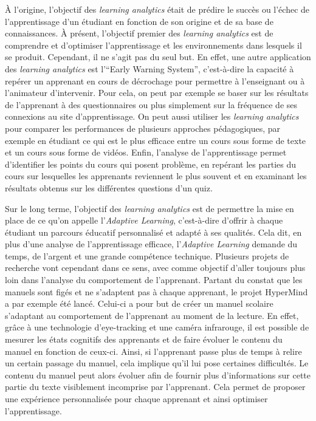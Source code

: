            À l’origine, l’objectif des \emph{learning analytics} était de prédire le succès ou l’échec de l’apprentissage d’un étudiant en fonction de son origine et de sa base de connaissances. À présent, l’objectif premier des \emph{learning analytics} est de comprendre et d’optimiser l’apprentissage et les environnements dans lesquels il se produit. Cependant, il ne s’agit pas du seul but. En effet, une autre application des \emph{learning analytics} est l’\enquote{Early Warning System}, c’est-à-dire la capacité à repérer un apprenant en cours de décrochage pour permettre à l’enseignant ou à l’animateur d’intervenir. Pour cela, on peut par exemple se baser sur les résultats de l’apprenant à des questionnaires ou plus simplement sur la fréquence de ses connexions au site d’apprentissage. On peut aussi utiliser les \emph{learning analytics} pour comparer les performances de plusieurs approches pédagogiques, par exemple en étudiant ce qui est le plus efficace entre un cours sous forme de texte et un cours sous forme de vidéos. Enfin, l’analyse de l’apprentissage permet d’identifier les points du cours qui posent problème, en repérant les parties du cours sur lesquelles les apprenants reviennent le plus souvent et en examinant les résultats obtenus sur les différentes questions d’un quiz.
       
           Sur le long terme, l’objectif des \emph{learning analytics} est de permettre la mise en place de ce qu’on appelle l’\emph{Adaptive Learning}, c’est-à-dire d’offrir à chaque étudiant un parcours éducatif personnalisé et adapté à ses qualités. Cela dit, en plus d’une analyse de l’apprentissage efficace, l’\emph{Adaptive Learning} demande du temps, de l’argent et une grande compétence technique. Plusieurs projets de recherche vont cependant dans ce sens, avec comme objectif d’aller toujours plus loin dans l’analyse du comportement de l’apprenant. Partant du constat que les manuels sont figés et ne s’adaptent pas à chaque apprenant, le projet HyperMind a par exemple été lancé. Celui-ci a pour but de créer un manuel scolaire s’adaptant au comportement de l’apprenant au moment de la lecture. En effet, grâce à une technologie d'eye-tracking et une caméra infrarouge, il est possible de mesurer les états cognitifs des apprenants et de faire évoluer le contenu du manuel en fonction de ceux-ci. Ainsi, si l’apprenant passe plus de temps à relire un certain passage du manuel, cela implique qu’il lui pose certaines difficultés. Le contenu du manuel peut alors évoluer afin de fournir plus d’informations sur cette partie du texte visiblement incomprise par l’apprenant. Cela permet de proposer une expérience personnalisée pour chaque apprenant et ainsi optimiser l’apprentissage.
       
